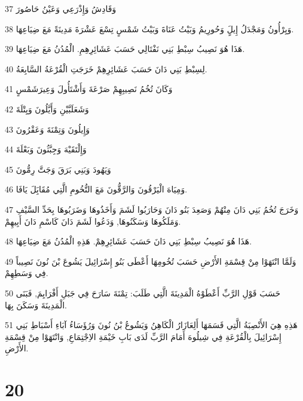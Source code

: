 \par 37 وَقَادِشُ وَإِذْرَعِي وَعَيْنُ حَاصُورَ
\par 38 وَيِرْأُونُ وَمَجْدَلُ إِيلٍَ وَحُورِيمُ وَبَيْتُ عَنَاةَ وَبَيْتُ شَمْسٍ تِسْعَ عَشْرَةَ مَدِينَةً مَعَ ضِيَاعِهَا.
\par 39 هَذَا هُوَ نَصِيبُ سِبْطِ بَنِي نَفْتَالِي حَسَبَ عَشَائِرِهِمِ. الْمُدُنُ مَعَ ضِيَاعِهَا.
\par 40 لِسِبْطِ بَنِي دَانَ حَسَبَ عَشَائِرِهِمْ خَرَجَتِ الْقُرْعَةُ السَّابِعَةُ.
\par 41 وَكَانَ تُخُمُ نَصِيبِهِمْ صَرْعَةَ وَأَشْتَأُولَ وَعِيرَشَمْسٍ
\par 42 وَشَعَلَبَّيْنِ وَأَيَّلُونَ وَيِتْلَةَ
\par 43 وَإِيلُونَ وَتِمْنَةَ وَعَقْرُونَ
\par 44 وَإِلْتَقَيْهَ وَجِبَّثُونَ وَبَعْلَةَ
\par 45 وَيَهُودَ وَبَنِي بَرَقَ وَجَتَّ رِمُّونَ
\par 46 وَمِيَاهَ الْيَرْقُونَ وَالرَّقُّونَ مَعَ التُّخُومِ الَّتِي مُقَابَِلَ يَافَا.
\par 47 وَخَرَجَ تُخُمُ بَنِي دَانَ مِنْهُمْ وَصَعِدَ بَنُو دَانَ وَحَارَبُوا لَشَمَ وَأَخَذُوهَا وَضَرَبُوهَا بِحَدِّ السَّيْفِ وَمَلَكُوهَا وَسَكَنُوهَا, وَدَعُوا لَشَمَ دَانَ كَاسْمِ دَانَ أَبِيهِمْ.
\par 48 هَذَا هُوَ نَصِيبُ سِبْطِ بَنِي دَانَ حَسَبَ عَشَائِرِهِمْ. هَذِهِ الْمُدُنُ مَعَ ضِيَاعِهَا.
\par 49 وَلَمَّا انْتَهَوْا مِنْ قِسْمَةِ الأَرْضِ حَسَبَ تُخُومِهَا أَعْطَى بَنُو إِسْرَائِيلَ يَشُوعَ بْنَ نُونَ نَصِيباً فِي وَسَطِهِمْ.
\par 50 حَسَبَ قَوْلِ الرَّبِّ أَعْطَوْهُ الْمَدِينَةَ الَّتِي طَلَبَ: تِمْنَةَ سَارَحَ فِي جَبَلِ أَفْرَايِمَ, فَبَنَى الْمَدِينَةَ وَسَكَنَ بِهَا.
\par 51 هَذِهِ هِيَ الأَنْصِبَةُ الَّتِي قَسَمَهَا أَلِعَازَارُ الْكَاهِنُ وَيَشُوعُ بْنُ نُونَ وَرُؤَسَاءُ آبَاءِ أَسْبَاطِ بَنِي إِسْرَائِيلَ بِالْقُرْعَةِ فِي شِيلُوهَ أَمَامَ الرَّبِّ لَدَى بَابِ خَيْمَةِ الاِجْتِمَاعِ, وَانْتَهَوْا مِنْ قِسْمَةِ الأَرْضِ.

\chapter{20}

